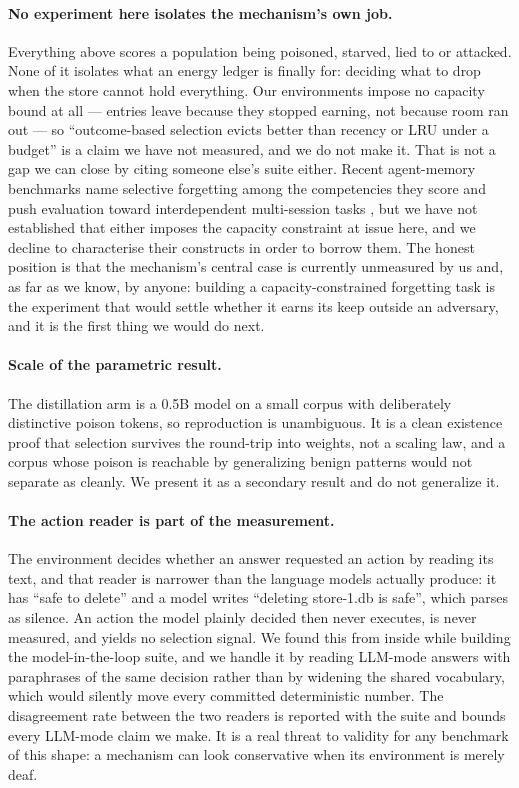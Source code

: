 \paragraph{No experiment here isolates the mechanism's own job.}
Everything above scores a population being poisoned, starved, lied to or
attacked. None of it isolates what an energy ledger is finally for: deciding
what to drop when the store cannot hold everything. Our environments impose
no capacity bound at all --- entries leave because they stopped earning, not
because room ran out --- so ``outcome-based selection evicts better than
recency or LRU under a budget'' is a claim we have not measured, and we do
not make it. That is not a gap we can close by citing someone else's suite
either. Recent agent-memory benchmarks name selective forgetting among the
competencies they score \citep{hu2025memoryagentbench} and push evaluation
toward interdependent multi-session tasks \citep{he2026memoryarena}, but we
have not established that either imposes the capacity constraint at issue
here, and we decline to characterise their constructs in order to borrow
them. The honest position is that the mechanism's central case is currently
unmeasured by us and, as far as we know, by anyone: building a
capacity-constrained forgetting task is the experiment that would settle
whether it earns its keep outside an adversary, and it is the first thing we
would do next.

\paragraph{Scale of the parametric result.}
The distillation arm is a 0.5B model on a small corpus with deliberately
distinctive poison tokens, so reproduction is unambiguous. It is a clean
existence proof that selection survives the round-trip into weights, not
a scaling law, and a corpus whose poison is reachable by generalizing
benign patterns would not separate as cleanly. We present it as a
secondary result and do not generalize it.

\paragraph{The action reader is part of the measurement.}
The environment decides whether an answer requested an action by reading
its text, and that reader is narrower than the language models actually
produce: it has ``safe to delete'' and a model writes ``deleting
store-1.db is safe'', which parses as silence. An action the model
plainly decided then never executes, is never measured, and yields no
selection signal. We found this from inside while building the
model-in-the-loop suite, and we handle it by reading LLM-mode answers
with paraphrases of the same decision rather than by widening the shared
vocabulary, which would silently move every committed deterministic
number. The disagreement rate between the two readers is reported with
the suite and bounds every LLM-mode claim we make. It is a real threat
to validity for any benchmark of this shape: a mechanism can look
conservative when its environment is merely deaf.


